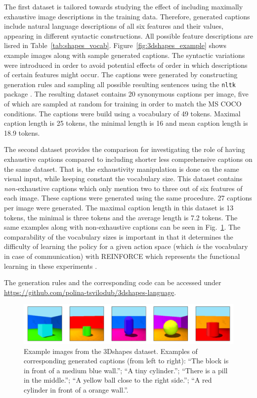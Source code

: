 The first dataset is tailored towards studying the effect of including maximally exhaustive image descriptions in the training data. Therefore, generated captions include natural language descriptions of all six features and their values, appearing in different syntactic constructions. All possible feature descriptions are lisred in Table~\ref{tab:shapes_vocab}. Figure~\ref{fig:3dshapes_example} shows example images along with sample generated captions. The syntactic variations were introduced in order to avoid potential effects of order in which descriptions of certain features might occur.
The captions were generated by constructing generation rules and sampling all possible resulting sentences using the \texttt{nltk} package \parencite{bird2006nltk}. The resulting dataset contains 20 synonymous captions per image, five of which are sampled at random for training in order to match the MS COCO conditions. The captions were build using a vocabulary of 49 tokens. Maximal caption length is 25 tokens, the minimal length is 16 and mean caption length is 18.9 tokens. 

The second dataset provides the comparison for investigating the role of having exhaustive captions compared to including shorter less comprehensive captions on the same dataset. That is, the exhaustivity manipulation is done on the same visual input, while keeping constant the vocabulary size. This dataset contains \textit{non-}exhaustive captions which only mention two to three out of six features of each image. These captions were generated using the same procedure. 27 captions per image were generated. The maximal caption length in this dataset is 13 tokens, the minimal is three tokens and the average length is 7.2 tokens.
The same examples along with non-exhaustive captions can be seen in Fig.~\ref{fig:3dshapes_example_short}.
The comparability of the vocabulary sizes is important in that it determines the difficulty of learning the policy for a given action space (which \emph{is} the vocabulary in case of communication) with REINFORCE which represents the functional learning in these experiments \parencite[cf.][]{havrylov2017emergence}.

The generation rules and the corresponding code can be accessed under \url{https://github.com/polina-tsvilodub/3dshapes-language}.

\begin{figure}
	\centering
	\includegraphics[width=\linewidth]{images/3dshapes_example.png}
	\caption{Example images from the 3Dshapes dataset. Examples of corresponding generated captions (from left to right): ``The block is in front of a medium blue wall.''; ``A tiny cylinder.''; ``There is a pill in the middle.''; ``A yellow ball close to the right side.''; ``A red cylinder in front of a orange wall.''.}
	\label{fig:3dshapes_example_short}
\end{figure} 

